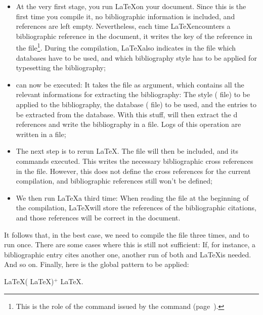 \begin{itemize}
\item At the very first stage, you run \LaTeX on your document. Since this is
  the first time you compile it, no bibliographic
  information is included, and references are left
  empty. Nevertheless, each time \LaTeX encounters a bibliographic reference 
  in the document, it writes the key of the reference in the 
  file\footnote{This is the role of the  command issued
  by the  command (\cf page~\pageref{citation}).}. During
  the compilation, \LaTeX also indicates in the  file which
  databases have to be used, and which bibliography style has
  to be applied for typesetting the bibliography;

\item \bt can now be executed: It takes the  file as
  argument, which contains all the relevant informations
  for extracting the bibliography: The style ( file) to be
  applied to the 
  bibliography, the database ( file) to be used, and the
  entries to be  extracted from the database.  With this stuff, \bt
  will then extract the d references 
  and write the bibliography in a 
  file. Logs of this operation are written in a  file;

\item The next step is to rerun \LaTeX. The  file will then
  be included, and its  commands executed. This writes
  the necessary bibliographic cross references in the 
  file. However, this does not define the cross references for the
  current compilation, and bibliographic references still won't be
  defined;

\item We then run \LaTeX a third time: When reading the  file
  at the beginning of the compilation, \LaTeX will store the
  references of the bibliographic citations, and those references
  will be correct in the document.
\end{itemize}


It follows that, in the best case, we need to compile the file three
times, and to run \bt once. There are some cases where this is still
not sufficient: If, for instance, a bibliographic entry cites another
one, another run of both \bt and \LaTeX is needed. And so on. 
Finally, here is the global pattern to be applied:
\begin{center}
\LaTeX (\bt {} \LaTeX )$^+$ \LaTeX.
\end{center}


